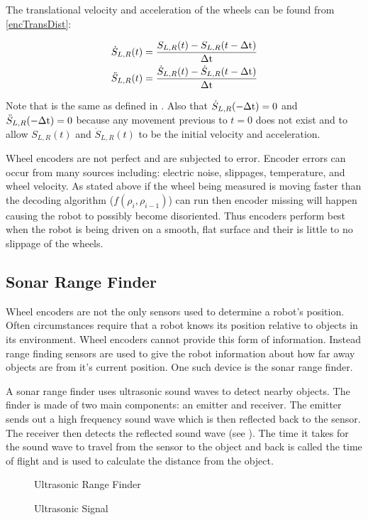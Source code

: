\documentclass[main.tex]{subfiles}
\begin{document}
The translational velocity and acceleration of the wheels can be found from \eqref{encTransDist}:

\begin{eqnarray}
\label{eq:encTransSpeed}
\dot{S}_{L,R}(t) = \frac{S_{L,R}(t)-S_{L,R}(t-\Delta\mathrm{t})}{\Delta\mathrm{t}}
\\
\ddot{S}_{L,R}(t) = \frac{\dot{S}_{L,R}(t)-\dot{S}_{L,R}(t-\Delta\mathrm{t})}{\Delta\mathrm{t}}
\end{eqnarray}

Note that \delt is the same as defined in . Also that
$\dot{S}_{L,R}(-\Delta\mathrm{t}) = 0$ and $\ddot{S}_{L,R}(-\Delta\mathrm{t}) = 0$ because any
movement previous to $t=0$ does not exist and to allow $S_{L,R}(t)$ and
$\dot{S}_{L,R}(t)$ to be the initial velocity and acceleration.

Wheel encoders are not perfect and are subjected to error. Encoder errors can
occur from many sources including: electric noise, slippages, temperature, and
wheel velocity. As stated above if the wheel being measured is moving faster
than the decoding algorithm ($f(\rho_i,\rho_{i-1})$) can run then encoder
missing will happen causing the robot to possibly become disoriented. Thus
encoders perform best when the robot is being driven on a smooth, flat surface
and their is little to no slippage of the wheels. 

\subsection{Sonar Range Finder}
Wheel encoders are not the only sensors used to determine a robot's position.
Often circumstances require that a robot knows its position relative to objects
in its environment. Wheel encoders cannot provide this form of information.
Instead range finding sensors are used to give the robot information about how
far away objects are from it's current position. One such device is the sonar
range finder. 

A sonar range finder uses ultrasonic sound waves to detect nearby objects. The
finder is made of two main components: an emitter and receiver. The emitter
sends out a high frequency sound wave which is then reflected back to the
sensor. The receiver then detects the reflected sound wave (see
). The time it takes for the sound wave to travel from the
sensor to the object and back is called the time of flight and is used to
calculate the distance from the object. 

\begin{figure}[H]
	\begin{center}
		
	\end{center}
	\caption{Ultrasonic Range Finder}
	\label{fig:ultraSon}
\end{figure}

\begin{figure}[H]
	\begin{center}
		
	\end{center}
	\caption{Ultrasonic Signal}
	\label{fig:ultraSig}
\end{figure}
\end{document}
